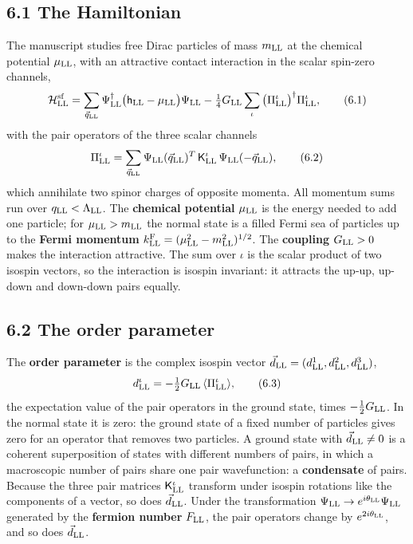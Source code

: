 \documentclass[
  10pt,
]{article}
\begin{document}
\hypertarget{the-hamiltonian}{%
\subsection{6.1 The Hamiltonian}\label{the-hamiltonian}}

The manuscript studies free Dirac particles of mass \(m_{\rm LL}\) at
the chemical potential \(\mu_{\rm LL}\), with an attractive contact
interaction in the scalar spin-zero channels,
\[\mathcal H^{\rm sf}_{\rm LL}=\sum_{\vec q_{\rm LL}}\Psi^\dagger_{\rm LL}\big(\mathsf h_{\rm LL}-\mu_{\rm LL}\big)\Psi_{\rm LL}-\tfrac14G_{\rm LL}\sum_\iota\big(\Pi^\iota_{\rm LL}\big)^\dagger\Pi^\iota_{\rm LL}, \tag{6.1}\]
with the pair operators of the three scalar channels
\[\Pi^\iota_{\rm LL}=\sum_{\vec q_{\rm LL}}\Psi_{\rm LL}(\vec q_{\rm LL})^T\,\mathsf K^\iota_{\rm LL}\,\Psi_{\rm LL}(-\vec q_{\rm LL}), \tag{6.2}\]
which annihilate two spinor charges of opposite momenta. All momentum
sums run over \(q_{\rm LL}<\Lambda_{\rm LL}\). The \textbf{chemical
potential} \(\mu_{\rm LL}\) is the energy needed to add one particle;
for \(\mu_{\rm LL}>m_{\rm LL}\) the normal state is a filled Fermi sea
of particles up to the \textbf{Fermi momentum}
\(k^{\rm F}_{\rm LL}=(\mu_{\rm LL}^2-m_{\rm LL}^2)^{1/2}\). The
\textbf{coupling} \(G_{\rm LL}>0\) makes the interaction attractive. The
sum over \(\iota\) is the scalar product of two isospin vectors, so the
interaction is isospin invariant: it attracts the up-up, up-down and
down-down pairs equally.

\hypertarget{the-order-parameter}{%
\subsection{6.2 The order parameter}\label{the-order-parameter}}

The \textbf{order parameter} is the complex isospin vector
\(\vec d_{\rm LL}=(d^1_{\rm LL},d^2_{\rm LL},d^3_{\rm LL})\),
\[d^\iota_{\rm LL}=-\tfrac12G_{\rm LL}\,\langle\Pi^\iota_{\rm LL}\rangle , \tag{6.3}\]
the expectation value of the pair operators in the ground state, times
\(-\tfrac12G_{\rm LL}\). In the normal state it is zero: the ground
state of a fixed number of particles gives zero for an operator that
removes two particles. A ground state with \(\vec d_{\rm LL}\neq0\) is a
coherent superposition of states with different numbers of pairs, in
which a macroscopic number of pairs share one pair wavefunction: a
\textbf{condensate} of pairs. Because the three pair matrices
\(\mathsf K^\iota_{\rm LL}\) transform under isospin rotations like the
components of a vector, so does \(\vec d_{\rm LL}\). Under the
transformation \(\Psi_{\rm LL}\to e^{i\theta_{\rm LL}}\Psi_{\rm LL}\)
generated by the \textbf{fermion number} \(F_{\rm LL}\), the pair
operators change by \(e^{2i\theta_{\rm LL}}\), and so does
\(\vec d_{\rm LL}\).
\end{document}
